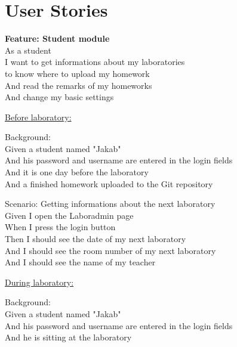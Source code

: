\chapter{User Stories}
\label{user-stories}

\textbf{Feature: Student module}\\ \hspace*{1cm}
As a student\\ \hspace*{1cm}
I want to get informations about my laboratories\\ \hspace*{1cm}
to know where to upload my homework\\ \hspace*{1cm}
And read the remarks of my homeworks\\ \hspace*{1cm}
And change my basic settings

\underline{Before laboratory:}

Background:\\ \hspace*{1cm}
Given a student named "Jakab"\\ \hspace*{1cm}
And his password and username are entered in the login fields\\ \hspace*{1cm}
And it is one day before the laboratory\\ \hspace*{1cm}
And a finished homework uploaded to the Git repository

Scenario: Getting informations about the next laboratory\\ \hspace*{1cm}
Given I open the Laboradmin page\\ \hspace*{1cm}
When I press the login button\\ \hspace*{1cm}
Then I should see the date of my next laboratory\\ \hspace*{1cm}
And  I should see the room number of my next laboratory\\ \hspace*{1cm}
And I should see the name of my teacher

\underline{During laboratory:}

Background:\\ \hspace*{1cm}
Given a student named "Jakab"\\ \hspace*{1cm}
And his password and username are entered in the login fields\\ \hspace*{1cm}
And he is sitting at the laboratory

